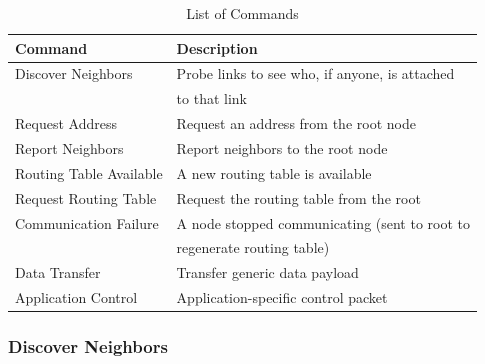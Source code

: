 \begin{table}
	\begin{center}
		\setlength{\extrarowheight}{1.5pt}
		\caption{List of Commands}
		\vspace{0.1cm}
		\begin{tabular}{|l|l|}
			\hline
			\textbf{Command} & \textbf{Description} \\
			\hline
			\hline
			Discover Neighbors & Probe links to see who, if anyone, is attached \\
			& to that link \\
			\hline
			Request Address & Request an address from the root node \\
			\hline
			Report Neighbors & Report neighbors to the root node \\
			\hline
			Routing Table Available & A new routing table is available \\
			\hline
			Request Routing Table & Request the routing table from the root \\
			\hline
			Communication Failure & A node stopped communicating (sent to root to \\
			& regenerate routing table) \\
			\hline
			Data Transfer & Transfer generic data payload \\
			\hline
			Application Control & Application-specific control packet \\
			\hline
		\end{tabular}
		\label{tab:protocol:commands}
	\end{center}
\end{table}

\subsubsection{Discover Neighbors} \label{ref:protocol:methodology:commands:discover_neighbors}

